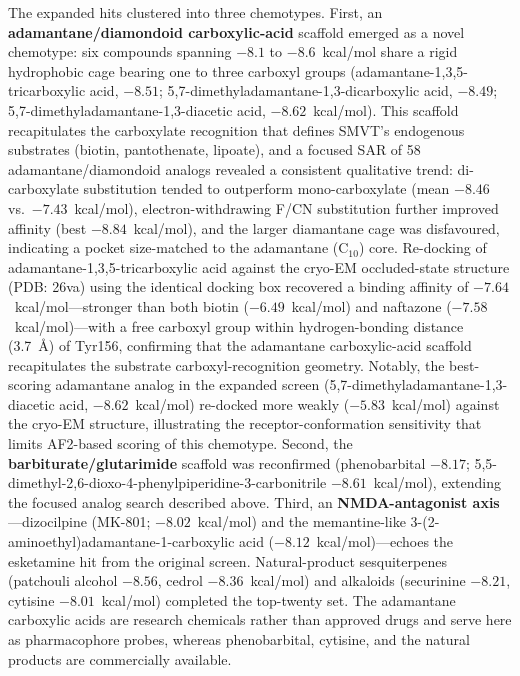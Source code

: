\documentclass[10pt,letterpaper]{article}
\begin{document}
The expanded hits clustered into three chemotypes. First, an \textbf{adamantane/diamondoid carboxylic-acid} scaffold emerged as a novel chemotype: six compounds spanning $-8.1$ to $-8.6$~kcal/mol share a rigid hydrophobic cage bearing one to three carboxyl groups (adamantane-1,3,5-tricarboxylic acid, $-8.51$; 5,7-dimethyladamantane-1,3-dicarboxylic acid, $-8.49$; 5,7-dimethyladamantane-1,3-diacetic acid, $-8.62$~kcal/mol). This scaffold recapitulates the carboxylate recognition that defines SMVT's endogenous substrates (biotin, pantothenate, lipoate), and a focused SAR of 58 adamantane/diamondoid analogs revealed a consistent qualitative trend: di-carboxylate substitution tended to outperform mono-carboxylate (mean $-8.46$ vs.\ $-7.43$~kcal/mol), electron-withdrawing F/CN substitution further improved affinity (best $-8.84$~kcal/mol), and the larger diamantane cage was disfavoured, indicating a pocket size-matched to the adamantane (C$_{10}$) core. Re-docking of adamantane-1,3,5-tricarboxylic acid against the cryo-EM occluded-state structure (PDB: 26va) using the identical docking box recovered a binding affinity of $-7.64$~kcal/mol---stronger than both biotin ($-6.49$~kcal/mol) and naftazone ($-7.58$~kcal/mol)---with a free carboxyl group within hydrogen-bonding distance (3.7~\AA{}) of Tyr156, confirming that the adamantane carboxylic-acid scaffold recapitulates the substrate carboxyl-recognition geometry. Notably, the best-scoring adamantane analog in the expanded screen (5,7-dimethyladamantane-1,3-diacetic acid, $-8.62$~kcal/mol) re-docked more weakly ($-5.83$~kcal/mol) against the cryo-EM structure, illustrating the receptor-conformation sensitivity that limits AF2-based scoring of this chemotype. Second, the \textbf{barbiturate/glutarimide} scaffold was reconfirmed (phenobarbital $-8.17$; 5,5-dimethyl-2,6-dioxo-4-phenylpiperidine-3-carbonitrile $-8.61$~kcal/mol), extending the focused analog search described above. Third, an \textbf{NMDA-antagonist axis}---dizocilpine (MK-801; $-8.02$~kcal/mol) and the memantine-like 3-(2-aminoethyl)adamantane-1-carboxylic acid ($-8.12$~kcal/mol)---echoes the esketamine hit from the original screen. Natural-product sesquiterpenes (patchouli alcohol $-8.56$, cedrol $-8.36$~kcal/mol) and alkaloids (securinine $-8.21$, cytisine $-8.01$~kcal/mol) completed the top-twenty set. The adamantane carboxylic acids are research chemicals rather than approved drugs and serve here as pharmacophore probes, whereas phenobarbital, cytisine, and the natural products are commercially available.
\end{document}
